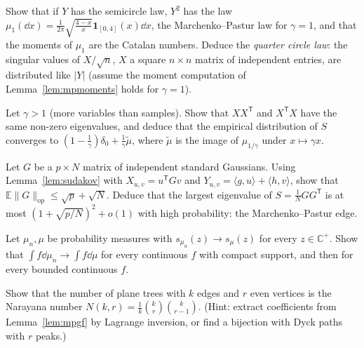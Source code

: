 \begin{exercise}[$\star\star$]\label{ex:quartercircle}
Show that if $Y$ has the semicircle law, $Y^2$ has the law $\mu_1(\dd x)=\frac1{2\pi}\sqrt{\frac{4-x}x}\mathbf 1_{[0,4]}(x)\dd x$, the Marchenko--Pastur law for $\gamma=1$, and that the moments of $\mu_1$ are the Catalan numbers. Deduce the
\emph{quarter circle law}: the singular values of $X/\sqrt n$, $X$ a square $n\times n$ matrix of independent entries, are distributed like $|Y|$ (assume the moment computation of Lemma~\ref{lem:mpmoments} holds for $\gamma=1$).
\end{exercise}

\begin{exercise}[$\star\star$]\label{ex:wide}
Let $\gamma>1$ (more variables than samples). Show that $XX^{\mathsf T}$ and $X^{\mathsf T}X$ have the same non-zero eigenvalues, and deduce that the empirical distribution of $S$ converges to
$(1-\frac1\gamma)\delta_0+\frac1\gamma\tilde\mu$, where $\tilde\mu$ is the image of $\mu_{1/\gamma}$ under $x\mapsto\gamma x$.
\end{exercise}

\begin{exercise}[$\star\star$]\label{ex:gordon}
Let $G$ be a $p\times N$ matrix of independent standard Gaussians. Using Lemma~\ref{lem:sudakov} with $X_{u,v}=u^{\mathsf T}Gv$ and $Y_{u,v}=\langle g,u\rangle+\langle h,v\rangle$, show that $\mathbb E\|G\|_{\mathrm{op}}\le\sqrt p+\sqrt N$. Deduce that the
largest eigenvalue of $S=\frac1NGG^{\mathsf T}$ is at most $(1+\sqrt{p/N})^2+o(1)$ with high probability: the Marchenko--Pastur edge.
\end{exercise}

\begin{exercise}[$\star\star$]\label{ex:stieltjesconv}
Let $\mu_n,\mu$ be probability measures with $s_{\mu_n}(z)\to s_\mu(z)$ for every $z\in\mathbb C^+$. Show that $\int f\dd\mu_n\to\int f\dd\mu$ for every continuous $f$ with compact support, and then for every bounded continuous $f$.
\end{exercise}

\begin{exercise}[$\star\star\star$]\label{ex:narayana}
Show that the number of plane trees with $k$ edges and $r$ even vertices is the Narayana number $N(k,r)=\frac1k\binom kr\binom k{r-1}$. (Hint: extract coefficients from Lemma~\ref{lem:mpgf} by Lagrange inversion, or find a bijection with
Dyck paths with $r$ peaks.)
\end{exercise}

